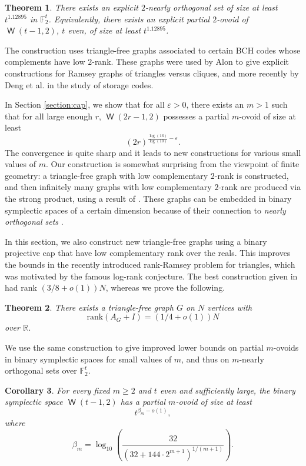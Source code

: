 \documentclass[a4paper,11pt]{amsproc}
\theoremstyle{plain}
\newtheorem{Theorem} {Theorem} [section]
\newtheorem{Corollary} [Theorem] {Corollary}
\theoremstyle{definition}
\newcommand{\<}{\langle}
\renewcommand{\>}{\rangle} %
\DeclareMathOperator\w{\mathsf{W}}
\begin{document}
\begin{Theorem}\label{thm:nearorth}
There exists an explicit $2$-nearly orthogonal set of size at least $t^{1.12895}$ in $\mathbb{F}_2^t$. 
Equivalently, there exists an explicit partial $2$-ovoid of $\w(t-1,2)$, $t$ even, of size at least $t^{1.12895}$.
\end{Theorem}

The construction uses triangle-free graphs associated to certain BCH codes whose complements have low $2$-rank. 
These graphs were used by Alon \cite{Alon95} to give explicit constructions for Ramsey graphs of triangles versus cliques, and more recently by Deng et al. \cite{DHWX2023} in the study of storage codes. 

In Section \ref{section:cap}, we show 
that for all $\varepsilon > 0$, there exists an $m>1$ such that for all large enough $r$,
$\w(2r-1, 2)$ possesses a partial $m$-ovoid of size at least
\[
(2r)^{\frac{\log(16)}{\log(10)}-\varepsilon}.
\]
The convergence is quite sharp and it leads to new constructions for various small values of $m$. 
Our construction is somewhat surprising from the viewpoint of finite geometry: a triangle-free
graph with low complementary $2$-rank is constructed, and then infinitely many 
graphs with low complementary $2$-rank are produced via the strong product, using
a result of \cite{BLS2024}. 
These graphs can be embedded in binary symplectic spaces
of a certain dimension because of their connection to \emph{nearly orthogonal sets} \cite{Chawin24}.

In this section, we also construct new triangle-free graphs using a binary projective cap that have low complementary rank over the reals. 
This improves the bounds in the recently introduced rank-Ramsey problem \cite{BLS2024} for triangles, which was motivated by the famous log-rank conjecture.
The best construction given in \cite{BLS2024} had rank $(3/8 + o(1))N$, whereas we prove the following.

\begin{Theorem}\label{cor:rank_ramsey_cap}
There exists a triangle-free graph $G$ on $N$ vertices with 
\[
\mathrm{rank}(A_G + I) = (1/4 + o(1))N
\]
over $\mathbb{R}$.
\end{Theorem}

We use the same construction to give improved lower bounds on partial $m$-ovoids in binary symplectic spaces for small values of $m$, and thus on $m$-nearly orthogonal sets over $\mathbb{F}_2^t$. 

\begin{Corollary}\label{cor:partovoidW}
For every fixed $m \geq 2$ and $t$ even and sufficiently large,
the binary symplectic space $\w(t-1, 2)$ has a partial $m$-ovoid of size at least 
\[t^{\beta_m - o(1)},\]
where 
\[\beta_m =  \log_{10}\left(\frac{32}{\left(32+144\cdot 2^{m+1}\right)^{1/(m+1)}}\right).\]
\end{Corollary}
\end{document}
